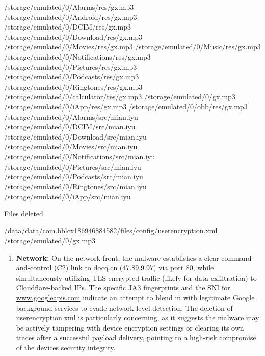 \documentclass[
]{article}
\newenvironment{Shaded}{}{}
\newcommand{\NormalTok}[1]{#1}
\begin{document}
\begin{Shaded}
\begin{Highlighting}[]
\NormalTok{    /storage/emulated/0/Alarms/res/gx.mp3}
\NormalTok{    /storage/emulated/0/Android/res/gx.mp3}
\NormalTok{    /storage/emulated/0/DCIM/res/gx.mp3}
\NormalTok{    /storage/emulated/0/Download/res/gx.mp3}
\NormalTok{    /storage/emulated/0/Movies/res/gx.mp3}
\NormalTok{    /storage/emulated/0/Music/res/gx.mp3}
\NormalTok{    /storage/emulated/0/Notifications/res/gx.mp3}
\NormalTok{    /storage/emulated/0/Pictures/res/gx.mp3}
\NormalTok{    /storage/emulated/0/Podcasts/res/gx.mp3}
\NormalTok{    /storage/emulated/0/Ringtones/res/gx.mp3}
\NormalTok{    /storage/emulated/0/calculator/res/gx.mp3}
\NormalTok{    /storage/emulated/0/gx.mp3}
\NormalTok{    /storage/emulated/0/iApp/res/gx.mp3}
\NormalTok{    /storage/emulated/0/obb/res/gx.mp3}
\NormalTok{    /storage/emulated/0/Alarms/src/mian.iyu}
\NormalTok{    /storage/emulated/0/DCIM/src/mian.iyu}
\NormalTok{    /storage/emulated/0/Download/src/mian.iyu}
\NormalTok{    /storage/emulated/0/Movies/src/mian.iyu}
\NormalTok{    /storage/emulated/0/Notifications/src/mian.iyu}
\NormalTok{    /storage/emulated/0/Pictures/src/mian.iyu}
\NormalTok{    /storage/emulated/0/Podcasts/src/mian.iyu}
\NormalTok{    /storage/emulated/0/Ringtones/src/mian.iyu}
\NormalTok{    /storage/emulated/0/iApp/src/mian.iyu}

\NormalTok{Files deleted}

\NormalTok{    /data/data/com.bblcx186946884582/files/config/userencryption.xml}
\NormalTok{    /storage/emulated/0/gx.mp3}
\end{Highlighting}
\end{Shaded}

\begin{enumerate}
\def\labelenumi{\arabic{enumi}.}
\item
  \textbf{Network:} On the network front, the malware establishes a
  clear command-and-control (C2) link to docq.cn (47.89.9.97) via port
  80, while simultaneously utilizing TLS-encrypted traffic (likely for
  data exfiltration) to Cloudflare-backed IPs. The specific JA3
  fingerprints and the SNI for \url{www.googleapis.com} indicate an
  attempt to blend in with legitimate Google background services to
  evade network-level detection. The deletion of userencryption.xml is
  particularly concerning, as it suggests the malware may be actively
  tampering with device encryption settings or clearing its own traces
  after a successful payload delivery, pointing to a high-risk
  compromise of the device\textquotesingle s security integrity.
\end{enumerate}
\end{document}
